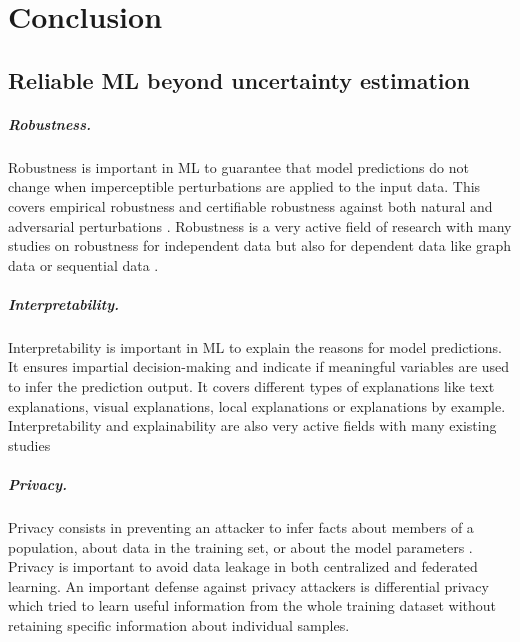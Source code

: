 \chapter{Conclusion}
\label{chap:conclusion}

\section{Reliable ML beyond uncertainty estimation}

\paragraph{Robustness.} Robustness is important in ML to guarantee that model predictions do not change when imperceptible perturbations are applied to the input data. This covers empirical robustness and certifiable robustness against both natural and adversarial perturbations \cite{tu2020empirical, chun2020empirical, cohen2019, zugner2020certifiable}. Robustness is a very active field of research with many studies on robustness for independent data \cite{silva2020opportunies} but also for dependent data like graph data \cite{GNNBook-ch8-gunnemann} or sequential data \cite{cheng2020}.

\paragraph{Interpretability.} Interpretability is important in ML to explain the reasons for model predictions. It ensures impartial decision-making and indicate if meaningful variables are used to infer the prediction output. It covers different types of explanations like text explanations, visual explanations, local explanations or explanations by example. Interpretability and explainability are also very active fields with many existing studies \cite{arrieta2019explainable, overview-interpretable-ml}

\paragraph{Privacy.} Privacy consists in preventing an attacker to infer facts about members of a population, about data in the training set, or about the model parameters \cite{cristofaro2020privacy, cristofaro2021privacy}. Privacy is important to avoid data leakage in both centralized and federated learning. An important defense against privacy attackers is differential privacy \cite{buglesi2006privacy} which tried to learn useful information from the whole training dataset without retaining specific information about individual samples.

